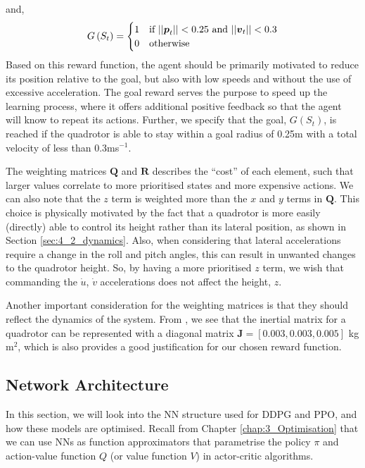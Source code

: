 and,
\begin{equation}
    G\,(S_t) =
    \begin{cases} 
      1 & \text{if} \,\, || {\boldsymbol{p}}_t || < 0.25 \,\, \text{and}\,\, || {\boldsymbol{v}}_t || < 0.3 \\
      0 & \text{otherwise}
    \end{cases}
    \label{4_goal_condition}
\end{equation}
Based on this reward function, the agent should be primarily motivated to reduce its position relative to the goal, but also with low speeds and without the use of excessive acceleration.
The goal reward serves the purpose to speed up the learning process, where it offers additional positive feedback so that the agent will know to repeat its actions. Further, we specify that the goal, $G(S_t)$, is reached if the quadrotor is able to stay within a goal radius of 0.25m with a total velocity of less than 0.3ms$^{-1}$. 

The weighting matrices $\boldsymbol{Q}$ and $\boldsymbol{R}$ describes the ``cost'' of each element, such that larger values correlate to more prioritised states and more expensive actions.
We can also note that the $z$ term is weighted more than the $x$ and $y$ terms in $\boldsymbol{Q}$. This choice is physically motivated by the fact that a quadrotor is more easily (directly) able to control its height rather than its lateral position, as shown in Section \ref{sec:4_2_dynamics}. Also, when considering that lateral accelerations require a change in the roll and pitch angles, this can result in unwanted changes to the quadrotor height. So, by having a more prioritised $z$ term, we wish that commanding the $\dot u$, $\dot v$ accelerations does not affect the height, $z$.

Another important consideration for the weighting matrices is that they should reflect the dynamics of the system. From \cite{song2021droneRacing}, we see that the inertial matrix for a quadrotor can be represented with a diagonal matrix $\boldsymbol{J} = [0.003, 0.003, 0.005]$ kg m$^2$, which is also provides a good justification for our chosen reward function.


\subsection{Network Architecture}
\label{sec:4_5_networkArchitecture}

In this section, we will look into the NN structure used for DDPG and PPO, and how these models are optimised. Recall from Chapter \ref{chap:3_Optimisation} that we can use NNs as function approximators that parametrise the policy $\pi$ and action-value function $Q$ (or value function $V$) in actor-critic algorithms.

